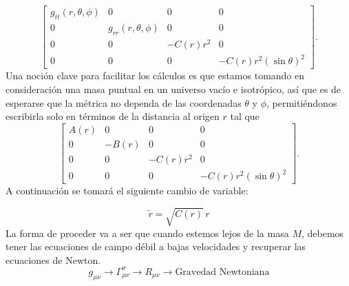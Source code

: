 \begin{equation}
    \left[\begin{array}{cccc}
            g_{t t}(r, \theta, \phi) & 0                        & 0         & 0                        \\
            0                        & g_{r r}(r, \theta, \phi) & 0         & 0                        \\
            0                        & 0                        & -C(r) r^2 & 0                        \\
            0                        & 0                        & 0         & -C(r) r^2(\sin \theta)^2
        \end{array}\right].
\end{equation}
Una noción clave para facilitar los cálculos es que estamos tomando en consideración una masa puntual en un universo vacío e isotrópico, así que es de esperarse que la métrica no dependa de las coordenadas $\theta$ y $\phi$, permitiéndonos escribirla solo en términos de la distancia al origen $r$ tal que
\begin{equation}
    \left[\begin{array}{cccc}
            A(r) & 0     & 0         & 0                        \\
            0    & -B(r) & 0         & 0                        \\
            0    & 0     & -C(r) r^2 & 0                        \\
            0    & 0     & 0         & -C(r) r^2(\sin \theta)^2
        \end{array}\right].
\end{equation}
A continuación se tomará el siguiente cambio de variable:

\begin{equation}
    \tilde{r}=\sqrt{C(r)} \, r
\end{equation}
La forma de proceder va a ser  que cuando estemos lejos de la masa $M$, debemos tener las ecuaciones de campo débil a bajas velocidades y recuperar las ecuaciones de Newton.
\begin{equation*}
    g_{\mu \nu} \rightarrow \Gamma_{\mu \nu}^\sigma \rightarrow R_{\mu \nu} \rightarrow \text{Gravedad Newtoniana}
\end{equation*}


